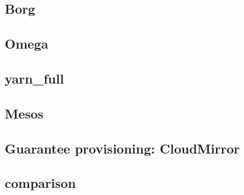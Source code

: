 

\subsection{Borg \texorpdfstring{\cite{borg}}{}}

\newpage

\subsection{Omega \texorpdfstring{\cite{omega}}{}} \label{omega}

\newpage

\subsection{\texorpdfstring{\glsdesc{yarn_full}}{}}

\newpage

\subsection{Mesos \texorpdfstring{\cite{mesos}}{}}

\newpage

\subsection{Guarantee provisioning: CloudMirror \texorpdfstring{\cite{cloudmirror}}{}}

\newpage

\subsection{\texorpdfstring{}{RMFs} comparison}
